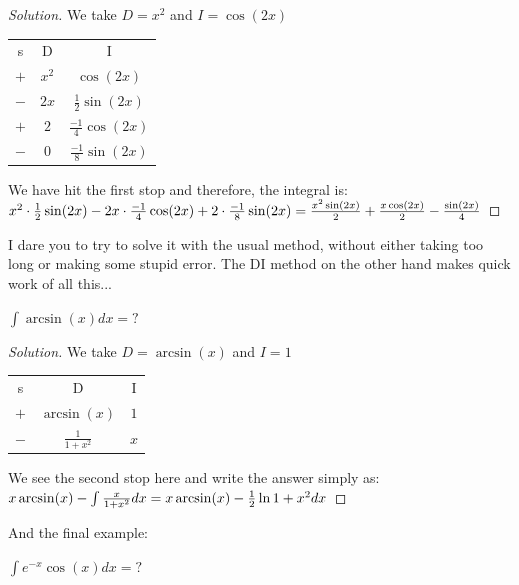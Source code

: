\begin{proof}
    [Solution]
    We take $D=x^2$ and $I=\cos(2x)$
    \begin{table} [H]
        \centering
        \begin{tabular}{c|c|c}
            s & D & I\\
            $+$ & $x^2$ & $\cos(2x)$\\
            $-$ & $2x$ & $\frac{1}{2}\sin(2x)$\\
            $+$ & $2$ & $\frac{-1}{4}\cos(2x)$\\
            $-$ & $0$ & $\frac{-1}{8}\sin(2x)$\\
        \end{tabular}
    \end{table}
    We have hit the first stop and therefore, the integral is:\\
    $x^2 \cdot \frac{1}{2}\sin(2x) - 2x \cdot \frac{-1}{4}\cos(2x) + 2 \cdot \frac{-1}{8}\sin(2x)\\
    = \frac{x^2\sin(2x)}{2}+\frac{x\cos(2x)}{2}-\frac{\sin(2x)}{4}$
\end{proof}
I dare you to try to solve it with the usual method, without either taking too long or making some stupid error. The DI method on the other hand makes quick work of all this...\\
\begin{example}
    $\int \arcsin(x)dx=?$
\end{example}
\begin{proof}
    [Solution]
    We take $D=\arcsin(x)$ and $I=1$
    \begin{table} [H]
        \centering
        \begin{tabular}{c|c|c}
            s & D & I\\
            $+$ & $\arcsin(x)$ & $1$\\
            $-$ & $\frac{1}{1+x^2}$ & $x$\\
        \end{tabular}
    \end{table}
    We see the second stop here and write the answer simply as:\\
    $x\arcsin(x)-\int \frac{x}{1+x^2} dx\\
    = x\arcsin(x)-\frac{1}{2} \ln{1+x^2} dx$
\end{proof}
And the final example:\\
\begin{example}
    $\int e^{-x}\cos(x)dx=?$
\end{example}
